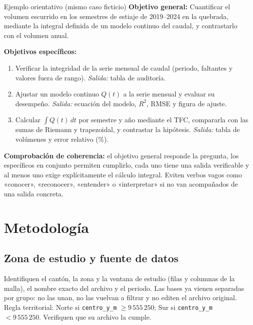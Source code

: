 \documentclass[11pt,a4paper]{article}
\begin{document}
\begin{ejemplo}{Ejemplo orientativo (mismo caso ficticio)}
\textbf{Objetivo general:} Cuantificar el volumen escurrido en los semestres de estiaje de 2019--2024 en la quebrada, mediante la integral definida de un modelo continuo del caudal, y contrastarlo con el volumen anual.

\textbf{Objetivos específicos:}
\begin{enumerate}
  \item Verificar la integridad de la serie mensual de caudal (periodo, faltantes y valores fuera de rango). \emph{Salida:} tabla de auditoría.
  \item Ajustar un modelo continuo $Q(t)$ a la serie mensual y evaluar su desempeño. \emph{Salida:} ecuación del modelo, $R^2$, RMSE y figura de ajuste.
  \item Calcular $\int Q(t)\,dt$ por semestre y año mediante el TFC, compararla con las sumas de Riemann y trapezoidal, y contrastar la hipótesis. \emph{Salida:} tabla de volúmenes y error relativo (\%).
\end{enumerate}
\end{ejemplo}

\textbf{Comprobación de coherencia:} el objetivo general responde la pregunta, los específicos en conjunto permiten cumplirlo, cada uno tiene una salida verificable y al menos uno exige explícitamente el cálculo integral. Eviten verbos vagos como «conocer», «reconocer», «entender» o «interpretar» si no van acompañados de una salida concreta.

\section{Metodología}

\subsection*{Zona de estudio y fuente de datos}
Identifiquen el cantón, la zona y la ventana de estudio (filas y columnas de la malla), el nombre exacto del archivo y el periodo. Las bases ya vienen separadas por grupo: no las unan, no las vuelvan a filtrar y no editen el archivo original. Regla territorial: Norte si \texttt{centro\_y\_m} $\geq 9\,555\,250$; Sur si \texttt{centro\_y\_m} $< 9\,555\,250$. Verifiquen que su archivo la cumple.
\end{document}
